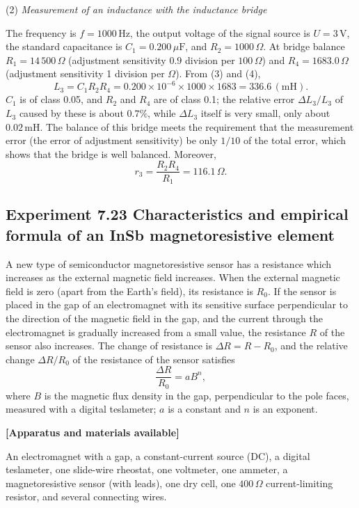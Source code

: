 (2) \emph{Measurement of an inductance with the inductance bridge}

The frequency is $f=1000\,\mathrm{Hz}$, the output voltage of the signal source is $U=3\,\mathrm{V}$, the standard capacitance is $C_1=0.200\,\mu\mathrm{F}$, and $R_2=1000\,\Omega$. At bridge balance $R_1=14\,500\,\Omega$ (adjustment sensitivity $0.9$ division per $100\,\Omega$) and $R_4=1683.0\,\Omega$ (adjustment sensitivity 1 division per $\Omega$). From (3) and (4),
\[
L_3=C_1R_2R_4=0.200\times10^{-6}\times1000\times1683=336.6\,(\mathrm{mH}).
\]
$C_1$ is of class 0.05, and $R_2$ and $R_4$ are of class 0.1; the relative error $\Delta L_3/L_3$ of $L_3$ caused by these is about $0.7\%$, while $\Delta L_3$ itself is very small, only about $0.02\,\mathrm{mH}$. The balance of this bridge meets the requirement that the measurement error (the error of adjustment sensitivity) be only $1/10$ of the total error, which shows that the bridge is well balanced. Moreover,
\[
r_3=\frac{R_2R_4}{R_1}=116.1\,\Omega .
\]

\subsection*{Experiment 7.23 \quad Characteristics and empirical formula of an InSb magnetoresistive element}

A new type of semiconductor magnetoresistive sensor has a resistance which increases as the external magnetic field increases. When the external magnetic field is zero (apart from the Earth's field), its resistance is $R_0$. If the sensor is placed in the gap of an electromagnet with its sensitive surface perpendicular to the direction of the magnetic field in the gap, and the current through the electromagnet is gradually increased from a small value, the resistance $R$ of the sensor also increases. The change of resistance is $\Delta R=R-R_0$, and the relative change $\Delta R/R_0$ of the resistance of the sensor satisfies
\begin{equation}
\frac{\Delta R}{R_0}=aB^n, \tag{1}
\end{equation}
where $B$ is the magnetic flux density in the gap, perpendicular to the pole faces, measured with a digital teslameter; $a$ is a constant and $n$ is an exponent.

\textbf{[Apparatus and materials available]}

An electromagnet with a gap, a constant-current source (DC), a digital teslameter, one slide-wire rheostat, one voltmeter, one ammeter, a magnetoresistive sensor (with leads), one dry cell, one $400\,\Omega$ current-limiting resistor, and several connecting wires.

